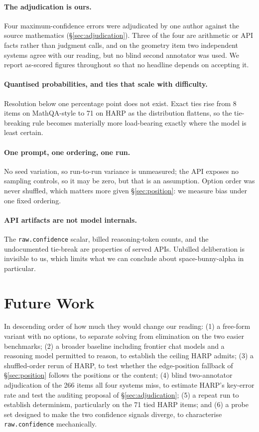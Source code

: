 \documentclass[11pt]{article}
\begin{document}
\paragraph{The adjudication is ours.}
Four maximum-confidence errors were adjudicated by one author against the source mathematics (\S\ref{sec:adjudication}). Three of the four are arithmetic or API facts rather than judgment calls, and on the geometry item two independent systems agree with our reading, but no blind second annotator was used. We report as-scored figures throughout so that no headline depends on accepting it.

\paragraph{Quantised probabilities, and ties that scale with difficulty.}
Resolution below one percentage point does not exist. Exact ties rise from 8 items on MathQA-style to 71 on HARP as the distribution flattens, so the tie-breaking rule becomes materially more load-bearing exactly where the model is least certain.

\paragraph{One prompt, one ordering, one run.}
No seed variation, so run-to-run variance is unmeasured; the API exposes no sampling controls, so it may be zero, but that is an assumption. Option order was never shuffled, which matters more given \S\ref{sec:position}: we measure bias under one fixed ordering.

\paragraph{API artifacts are not model internals.}
The \texttt{raw.confidence} scalar, billed reasoning-token counts, and the undocumented tie-break are properties of served APIs. Unbilled deliberation is invisible to us, which limits what we can conclude about space-bunny-alpha in particular.

\section{Future Work}
\label{sec:future}

In descending order of how much they would change our reading: (1) a free-form variant with no options, to separate solving from elimination on the two easier benchmarks; (2) a broader baseline including frontier chat models and a reasoning model permitted to reason, to establish the ceiling HARP admits; (3) a shuffled-order rerun of HARP, to test whether the edge-position fallback of \S\ref{sec:position} follows the positions or the content; (4) blind two-annotator adjudication of the 266 items all four systems miss, to estimate HARP's key-error rate and test the auditing proposal of \S\ref{sec:adjudication}; (5) a repeat run to establish determinism, particularly on the 71 tied HARP items; and (6) a probe set designed to make the two confidence signals diverge, to characterise \texttt{raw.confidence} mechanically.
\end{document}
